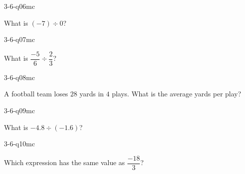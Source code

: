 \begin{practiceQuestion}{3-6-q06}{mc}
\begin{questionText}
What is $(-7) \div 0$?
\end{questionText}
\end{practiceQuestion}

\begin{practiceQuestion}{3-6-q07}{mc}
\begin{questionText}
What is $\dfrac{-5}{6} \div \dfrac{2}{3}$?
\end{questionText}
\end{practiceQuestion}

\begin{practiceQuestion}{3-6-q08}{mc}
\begin{questionText}
A football team loses $28$ yards in $4$ plays. What is the average yards per play?
\end{questionText}
\end{practiceQuestion}

\begin{practiceQuestion}{3-6-q09}{mc}
\begin{questionText}
What is $-4.8 \div (-1.6)$?
\end{questionText}
\end{practiceQuestion}

\begin{practiceQuestion}{3-6-q10}{mc}
\begin{questionText}
Which expression has the same value as $\dfrac{-18}{3}$?
\end{questionText}
\end{practiceQuestion}

